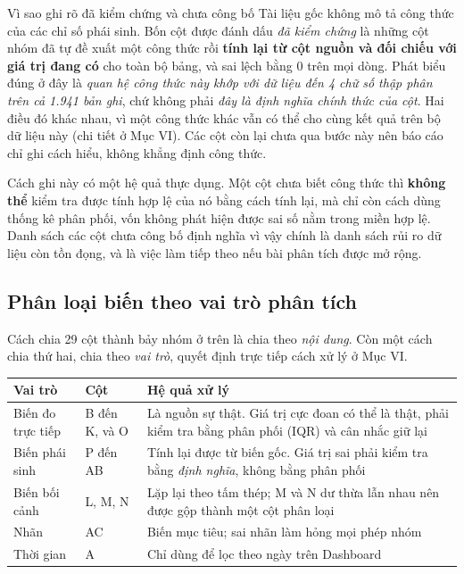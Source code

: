 \documentclass[12pt]{article}
\begin{document}
\begin{guidelinebox}{Vì sao ghi rõ đã kiểm chứng và chưa công bố}
Tài liệu gốc không mô tả công thức của các chỉ số phái sinh. Bốn cột được đánh dấu \emph{đã kiểm chứng} là những cột nhóm đã tự đề xuất một công thức rồi \textbf{tính lại từ cột nguồn và đối chiếu với giá trị đang có} cho toàn bộ bảng, và sai lệch bằng 0 trên mọi dòng. Phát biểu đúng ở đây là \emph{quan hệ công thức này khớp với dữ liệu đến 4 chữ số thập phân trên cả 1.941 bản ghi}, chứ không phải \emph{đây là định nghĩa chính thức của cột}. Hai điều đó khác nhau, vì một công thức khác vẫn có thể cho cùng kết quả trên bộ dữ liệu này (chi tiết ở Mục VI). Các cột còn lại chưa qua bước này nên báo cáo chỉ ghi cách hiểu, không khẳng định công thức.

\noindent Cách ghi này có một hệ quả thực dụng. Một cột chưa biết công thức thì \textbf{không thể} kiểm tra được tính hợp lệ của nó bằng cách tính lại, mà chỉ còn cách dùng thống kê phân phối, vốn không phát hiện được sai số nằm trong miền hợp lệ. Danh sách các cột chưa công bố định nghĩa vì vậy chính là danh sách rủi ro dữ liệu còn tồn đọng, và là việc làm tiếp theo nếu bài phân tích được mở rộng.
\end{guidelinebox}

\subsection{Phân loại biến theo vai trò phân tích}

Cách chia 29 cột thành bảy nhóm ở trên là chia theo \emph{nội dung}. Còn một cách chia thứ hai, chia theo \emph{vai trò}, quyết định trực tiếp cách xử lý ở Mục VI.

\begin{center}
\small
\begin{tabular}{@{}p{3.4cm} p{4.4cm} p{8.2cm}@{}}
\toprule
\textbf{Vai trò} & \textbf{Cột} & \textbf{Hệ quả xử lý} \\
\midrule
Biến đo trực tiếp & B đến K, và O & Là nguồn sự thật. Giá trị cực đoan có thể là thật, phải kiểm tra bằng phân phối (IQR) và cân nhắc giữ lại \\
\addlinespace[3pt]
Biến phái sinh & P đến AB & Tính lại được từ biến gốc. Giá trị sai phải kiểm tra bằng \emph{định nghĩa}, không bằng phân phối \\
\addlinespace[3pt]
Biến bối cảnh & L, M, N & Lặp lại theo tấm thép; M và N dư thừa lẫn nhau nên được gộp thành một cột phân loại \\
\addlinespace[3pt]
Nhãn & AC & Biến mục tiêu; sai nhãn làm hỏng mọi phép nhóm \\
\addlinespace[3pt]
Thời gian & A & Chỉ dùng để lọc theo ngày trên Dashboard \\
\bottomrule
\end{tabular}
\end{center}
\end{document}
